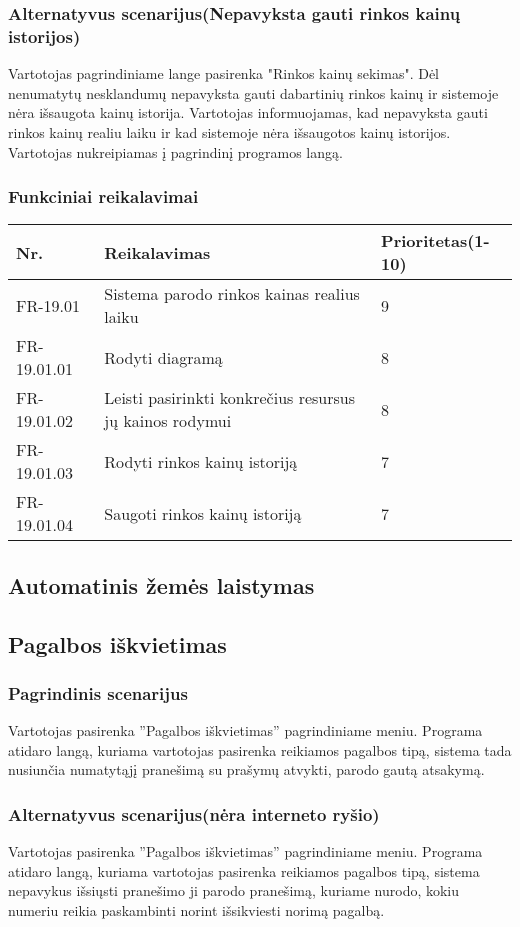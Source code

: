 \documentclass[oneside]{VUMIFPSkursinis}
\begin{document}
	\subsubsection{Alternatyvus scenarijus(Nepavyksta gauti rinkos kainų istorijos)}
	Vartotojas pagrindiniame lange pasirenka "Rinkos kainų sekimas". Dėl nenumatytų nesklandumų nepavyksta gauti dabartinių rinkos kainų ir sistemoje nėra išsaugota kainų istorija. Vartotojas informuojamas, kad nepavyksta gauti rinkos kainų realiu laiku ir kad sistemoje nėra išsaugotos kainų istorijos. Vartotojas nukreipiamas  į pagrindinį programos langą.
	\subsubsection{Funkciniai reikalavimai}
\begin{table}[htbp]
	\begin{tabularx}{1\textwidth}{ |P{2.5cm}|X|P{3cm }| } \hline
		Nr. & Reikalavimas & Prioritetas(1-10) \\ \hline
		FR-19.01 & Sistema parodo rinkos kainas realius laiku &  9 \\ \hline
		FR-19.01.01 & Rodyti diagramą & 8 \\ \hline
		FR-19.01.02 & Leisti pasirinkti konkrečius resursus jų kainos rodymui & 8 \\ \hline
		FR-19.01.03 & Rodyti rinkos kainų istoriją & 7 \\ \hline
		FR-19.01.04 & Saugoti rinkos kainų istoriją & 7 \\ \hline
		
	\end{tabularx}
\end{table}
	 
\subsection{Automatinis žemės laistymas}
\subsection{Pagalbos iškvietimas}
	\subsubsection{Pagrindinis scenarijus}
	Vartotojas pasirenka ''Pagalbos iškvietimas'' pagrindiniame meniu. Programa atidaro langą, kuriama vartotojas pasirenka reikiamos pagalbos tipą, sistema tada nusiunčia numatytąjį pranešimą su prašymų atvykti, parodo gautą atsakymą.
	\subsubsection{Alternatyvus scenarijus(nėra interneto ryšio)}
	Vartotojas pasirenka ''Pagalbos iškvietimas'' pagrindiniame meniu. Programa atidaro langą, kuriama vartotojas pasirenka reikiamos pagalbos tipą, sistema nepavykus išsiųsti pranešimo ji parodo pranešimą, kuriame nurodo, kokiu numeriu reikia paskambinti norint išsikviesti norimą pagalbą.
\end{document}
